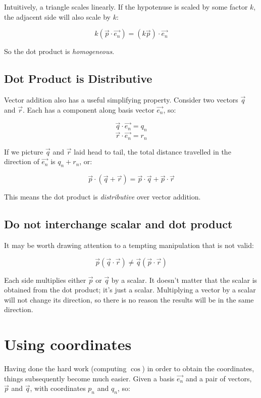 Intuitively, a triangle scales linearly. If the hypotenuse is scaled by some factor $k$, the adjacent side will also scale by $k$:

$$
k(\vec{p}\cdot\vec{e_n})
= (k\vec{p})\cdot\vec{e_n}
$$

So the dot product is \textit{homogeneous}.

\subsection{Dot Product is Distributive}

Vector addition also has a useful simplifying property. Consider two vectors $\vec{q}$ and $\vec{r}$. Each has a component along basis vector $\vec{e_n}$, so:

$$\vec{q} \cdot \vec{e_n} = q_n$$
$$\vec{r} \cdot \vec{e_n} = r_n$$

If we picture $\vec{q}$ and $\vec{r}$ laid head to tail, the total distance travelled in the direction of $\vec{e_n}$ is $q_n + r_n$, or:

$$
\vec{p} \cdot (\vec{q} +\vec{r} )
= \vec{p} \cdot \vec{q} +\vec{p} \cdot \vec{r}
$$

This means the dot product is \textit{distributive} over vector addition.

\subsection{Do not interchange scalar and dot product}

It may be worth drawing attention to a tempting manipulation that is not valid:

$$
\vec{p} \left( \vec{q} \cdot \vec{r} \right) \ne \vec{q} \left( \vec{p} \cdot \vec{r} \right)
$$

Each side multiplies either $\vec{p}$ or $\vec{q}$ by a scalar. It doesn't matter that the scalar is obtained from the dot product; it's just a scalar. Multiplying a vector by a scalar will not change its direction, so there is no reason the results will be in the same direction.

\section{Using coordinates}

Having done the hard work (computing $\cos$) in order to obtain the coordinates, things subsequently become much easier. Given a basis $\vec{e_n}$ and a pair of vectors, $\vec{p}$ and $\vec{q}$, with coordinates $p_n$ and $q_n$, so:

